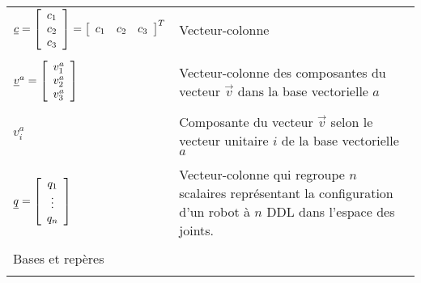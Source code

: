 \begin{center}
\begin{tabular}{p{5cm}  p{9cm}}
		$\underline{c} = \left[ \begin{array}{c}
							  c_1 \\ c_2 \\ c_3
		\end{array}  \right] = \left[\begin{array}{ccc} c_1 & c_2 & c_3 \end{array}\right]^T $
		& Vecteur-colonne \\   &  \\
		$\underline{v}^{a}  = \left[ \begin{array}{c}
								   v_1^a \\ v_2^a \\ v_3^a
		\end{array}  \right]$   & Vecteur-colonne des composantes du vecteur $\vec{v}$ dans la base vectorielle $a$  \\   &  \\
		$v^{a}_i$        & Composante du vecteur $\vec{v}$ selon le vecteur unitaire $i$ de la base vectorielle $a$ \\   &  \\
		$\underline{q} = \left[ \begin{array}{c}
							  q_1 \\  \vdots \\ q_n
		\end{array}  \right] $            & Vecteur-colonne qui regroupe $n$ scalaires représentant la configuration d'un robot à $n$ DDL dans l'espace des joints. \\   &  \\
		\multicolumn{2}{l}{Bases et repères} \\ \hline \\

\end{tabular}
\end{center}
